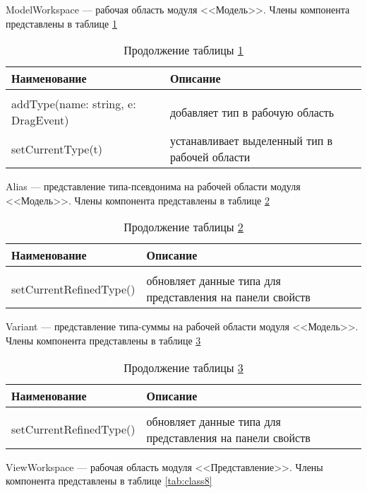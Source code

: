 ModelWorkspace --- рабочая область модуля <<Модель>>. Члены компонента представлены в таблице \ref{tab:class5}

\begin{longtable} {| p{8.3cm} | p{8.35cm}l |}
	\caption{Члены компонента ModelWorkspace}
	\label{tab:class5}\\
	\hline
	\centering Наименование &  \centering Описание & \\
	\hline
	\endfirsthead
	\caption*{Продолжение таблицы \ref{tab:class5}}\\
	\hline
	\endhead
	\hline
	\endfoot
	addType(name: string, e: DragEvent) & добавляет тип в рабочую область & \\
	\hline
	setCurrentType(t) & устанавливает выделенный тип в рабочей области & \\
\end{longtable}

Alias --- представление типа-псевдонима на рабочей области модуля <<Модель>>. Члены компонента представлены в таблице \ref{tab:class6}

\begin{longtable} {| p{8.3cm} | p{8.35cm}l |}
	\caption{Члены компонента Alias}
	\label{tab:class6}\\
	\hline
	\centering Наименование &  \centering Описание & \\
	\hline
	\endfirsthead
	\caption*{Продолжение таблицы \ref{tab:class6}}\\
	\hline
	\endhead
	\hline
	\endfoot
	setCurrentRefinedType() & обновляет данные типа для представления на панели свойств & \\
\end{longtable}

Variant --- представление типа-суммы на рабочей области модуля <<Модель>>. Члены компонента представлены в таблице \ref{tab:class7}

\begin{longtable} {| p{8.3cm} | p{8.35cm}l |}
	\caption{Члены компонента Variant}
	\label{tab:class7}\\
	\hline
	\centering Наименование &  \centering Описание & \\
	\hline
	\endfirsthead
	\caption*{Продолжение таблицы \ref{tab:class7}}\\
	\hline
	\endhead
	\hline
	\endfoot
	setCurrentRefinedType() & обновляет данные типа для представления на панели свойств & \\
\end{longtable}

ViewWorkspace --- рабочая область модуля <<Представление>>. Члены компонента представлены в таблице \ref{tab:class8}

